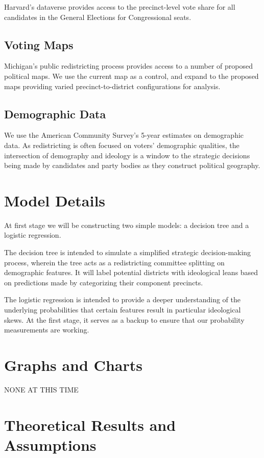 \documentclass{article}
\begin{document}
Harvard's dataverse provides access to the precinct-level vote share for 
all candidates in the General Elections for Congressional seats. 


\subsection{Voting Maps}


Michigan's public redistricting process provides access to a number of
proposed political maps. We use the current map as a control, and expand
to the proposed maps providing varied precinct-to-district
configurations for analysis.


\subsection{Demographic Data}


We use the American Community Survey's 5-year estimates on demographic data.
As redistricting is often focused on voters' demographic qualities, the 
intersection of demography and ideology is a window to the strategic decisions
being made by candidates and party bodies as they construct political geography.


\section{Model Details}


At first stage we will be constructing two simple models: a decision tree
and a logistic regression. 

The decision tree is intended to simulate a simplified strategic 
decision-making process, wherein the tree acts as a redistricting 
committee splitting on demographic features. It will label potential
districts with ideological leans based on predictions made by
categorizing their component precincts.

The logistic regression is intended to provide a deeper understanding
of the underlying probabilities that certain features result in 
particular ideological skews. At the first stage, it serves as a
backup to ensure that our probability measurements are working.


\section{Graphs and Charts}


NONE AT THIS TIME


\section{Theoretical Results and Assumptions}
\end{document}
